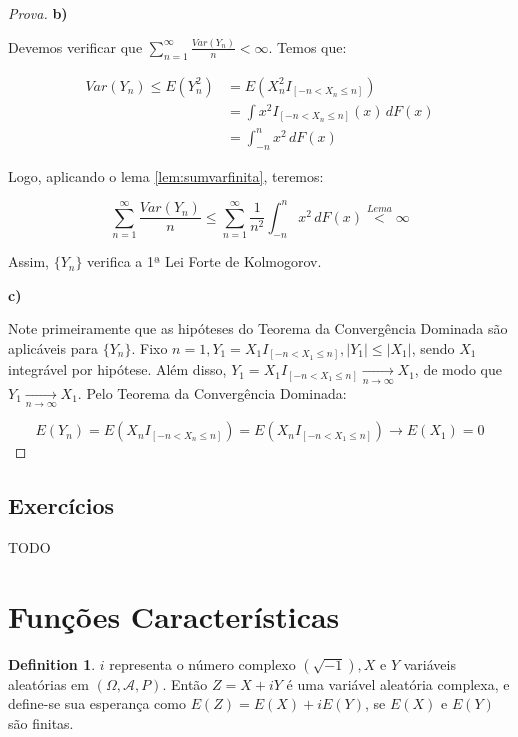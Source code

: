 \documentclass[
]{article}
\theoremstyle{definition}
\newtheorem{definition}{Definition}[section]
\theoremstyle{definition}
\theoremstyle{definition}
\theoremstyle{definition}
\theoremstyle{remark}
\begin{document}
\begin{proof}[Prova]
\textbf{b)}

Devemos verificar que \(\sum_{n=1}^{\infty}\frac{Var(Y_{n})}{n} < \infty\). Temos que:

\begin{align*}
Var(Y_{n}) \le E(Y_{n}^{2}) &= E(X_{n}^{2}I_{[-n < X_{n} \le n]}) \\
&= \int x^{2}I_{[-n < X_{n} \le n]}(x)\, dF(x) \\
&= \int_{-n}^{n}x^{2}\, dF(x)
\end{align*}

Logo, aplicando o lema \ref{lem:sumvarfinita}, teremos:

\begin{equation*}
\sum_{n=1}^{\infty}\frac{Var(Y_{n})}{n} \le \sum_{n=1}^{\infty}\frac{1}{n^{2}}\int_{-n}^{n}x^{2} \, dF(x) \stackrel{Lema}{<} \infty
\end{equation*}

Assim, \(\{Y_{n}\}\) verifica a 1ª Lei Forte de Kolmogorov.

\textbf{c)}

Note primeiramente que as hipóteses do Teorema da Convergência Dominada são aplicáveis para \(\{Y_{n}\}\). Fixo \(n = 1, Y_{1} = X_{1}I_{[-n < X_{1} \le n]}, |Y_{1}| \le |X_{1}|\), sendo \(X_{1}\) integrável por hipótese. Além disso, \(Y_{1} = X_{1}I_{[-n < X_{1} \le n]} \xrightarrow[n \to \infty]{}X_{1}\), de modo que \(Y_{1} \xrightarrow[n \to \infty]{}X_{1}\). Pelo Teorema da Convergência Dominada:

\begin{equation*}
E(Y_{n}) = E(X_{n}I_{[-n < X_{n} \le n]}) = E(X_{n}I_{[-n < X_{1} \le n]}) \to E(X_{1}) = 0
\end{equation*}
\end{proof}

\newpage

\hypertarget{exercuxedcios-4}{%
\subsection{Exercícios}\label{exercuxedcios-4}}

TODO

\newpage

\hypertarget{funuxe7uxf5es-caracteruxedsticas}{%
\section{Funções Características}\label{funuxe7uxf5es-caracteruxedsticas}}

\begin{definition}
\(i\) representa o número complexo \((\sqrt{-1}), X \text{ e } Y\) variáveis aleatórias em \((\Omega, \mathcal{A}, P)\). Então \(Z = X + iY\) é uma variável aleatória complexa, e define-se sua esperança como \(E(Z) = E(X) + iE(Y)\), se \(E(X) \text{ e } E(Y)\) são finitas.
\end{definition}
\end{document}
